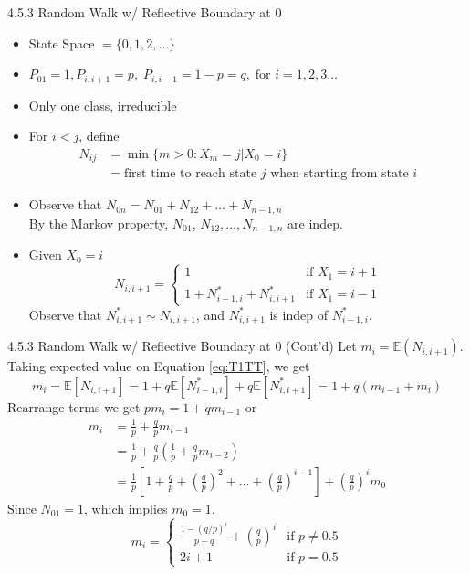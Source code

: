 \documentclass[letterpaper]{beamer}
\def\E{\mathbb E}
\begin{document}
\begin{frame}{4.5.3 Random Walk w/ Reflective Boundary at 0}
\begin{itemize}
\item State Space $=\{0,1,2,\ldots\}$
\item $P_{01}=1, P_{i,i+1}=p, \;P_{i,i-1}=1-p=q,\;\text{for } i=1,2,3\ldots$
\item Only one class, irreducible
\item For $i<j$, define
\begin{align*}
N_{ij}&=\min\{m> 0: X_m=j|X_0=i\}\\
&=\text{first time to reach state $j$ when starting from state $i$}
\end{align*}
\item Observe that $N_{0n}=N_{01}+N_{12}+\ldots+N_{n-1,n}$\\
By the Markov property, $N_{01}$, $N_{12},\ldots,N_{n-1,n}$ are indep.
\item Given $X_0=i$
\begin{equation}\label{eq:T1TT}
N_{i,i+1}=
\begin{cases}
1 & \text{if } X_1=i+1\\
1 + N^{*}_{i-1,i}+ N^{*}_{i,i+1} &\text{if } X_1=i-1
\end{cases}
\end{equation}
Observe that $N^{*}_{i,i+1}\sim N_{i,i+1}$, and $N^{*}_{i,i+1}$ is indep of $N^{*}_{i-1,i}$.
\end{itemize}
\end{frame}
\begin{frame}{4.5.3 Random Walk w/ Reflective Boundary at 0 (Cont'd)}
Let $m_i=\E(N_{i,i+1})$. Taking expected value on Equation \eqref{eq:T1TT}, we get
$$
m_i = \E[N_{i,i+1}]=
1+ q\E[N^{*}_{i-1,i}]+q\E[N^{*}_{i,i+1}]=1+q(m_{i-1}+m_i)
$$
Rearrange terms we get $p m_i=1+q m_{i-1}$ or
\begin{align*}
m_i
&=\frac{1}{p}+\frac{q}{p} m_{i-1}\\
&=\frac{1}{p}+\frac{q}{p}(\frac{1}{p}+\frac{q}{p}m_{i-2})\\
&=\frac{1}{p}\left[1+\frac{q}{p}+(\frac{q}{p})^2+\ldots+(\frac{q}{p})^{i-1}\right]+(\frac{q}{p})^im_{0}
\end{align*}
Since $N_{01}=1$, which implies $m_0=1$.
$$
m_i=
\begin{cases}
\frac{1-(q/p)^i}{p-q}+(\frac{q}{p})^i &\text{if } p\neq 0.5\\
2i+1 & \text{if } p=0.5
\end{cases}
$$
\end{frame}
\end{document}
